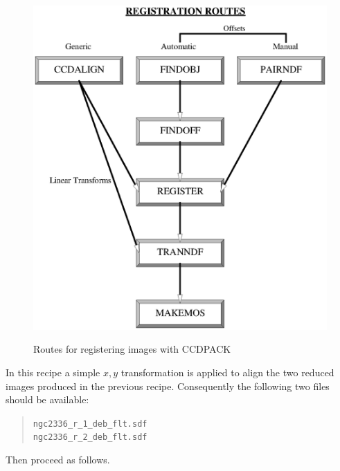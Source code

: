 \documentclass[twoside,11pt]{article}
\begin{document}
\begin{figure}[htbp]
  \centering
  \includegraphics[totalheight=7in]{sc5_reg.ps}
  \begin{quote}
  \caption{Routes for registering images with CCDPACK
  \label{REGROUTES} }
  \end{quote}
\end{figure}

In this recipe a simple $x,y$ transformation is applied to align the
two reduced images produced in the previous recipe.  Consequently
the following two files should be available:

\begin{quote}
{\tt ngc2336\_r\_1\_deb\_flt.sdf \\
ngc2336\_r\_2\_deb\_flt.sdf}
\end{quote}

Then proceed as follows.
\end{document}
